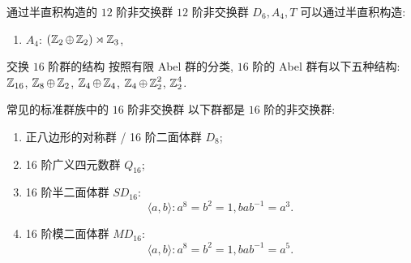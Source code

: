             \begin{xmp}
                {通过半直积构造的 \(12\) 阶非交换群}
                \(12\) 阶非交换群 \(D_6, A_4, T\) 可以通过半直积构造:
                \begin{enumerate}
                    \item \(A_4\): \((\operatorname{\mathbb{Z}}_2\oplus\operatorname{\mathbb{Z}}_2)\rtimes\operatorname{\mathbb{Z}}_3\), 
                \end{enumerate}
            \end{xmp}

            \begin{ins}
                {交换 \(16\) 阶群的结构}
                按照有限 Abel 群的分类, \(16\) 阶的 Abel 群有以下五种结构: \(\operatorname{\mathbb{Z}}_{16}\), \(\operatorname{\mathbb{Z}}_8\oplus\operatorname{\mathbb{Z}}_2\), \(\operatorname{\mathbb{Z}}_4\oplus\operatorname{\mathbb{Z}}_4\), \(\operatorname{\mathbb{Z}}_4\oplus\operatorname{\mathbb{Z}}_2^2\), \(\operatorname{\mathbb{Z}}_2^4\).
            \end{ins}

            \begin{ins}
                {常见的标准群族中的 \(16\) 阶非交换群}
                以下群都是 \(16\) 阶的非交换群:
                \begin{enumerate}
                    \item 正八边形的对称群 / 16 阶二面体群 \(D_8\);
                    \item 16 阶广义四元数群 \(Q_{16}\);
                    \item 16 阶半二面体群 \(SD_{16}\): \[\langle a,b\rangle:a^8=b^2=1, bab^{-1}=a^3.\]
                    \item 16 阶模二面体群 \(MD_{16}\): \[\langle a,b\rangle:a^8=b^2=1, bab^{-1}=a^5.\]
                \end{enumerate}
            \end{ins}

